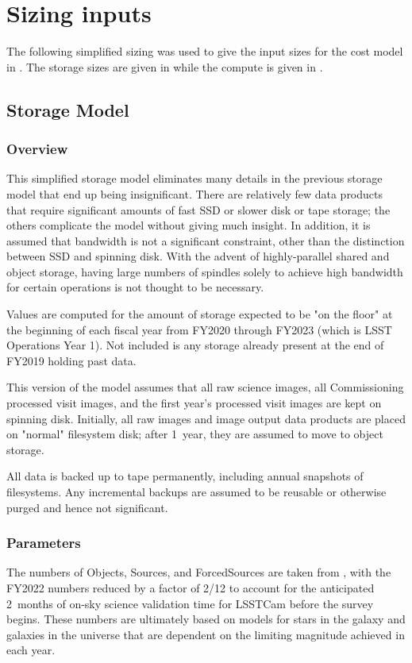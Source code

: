 \section{Sizing inputs}

The following simplified sizing was used to give the input sizes for the cost model in .
The storage sizes are given in  while the compute is given in .

\subsection{Storage Model}






\subsubsection{Overview}
This simplified storage model eliminates many details in the previous storage model  that end up being insignificant.
There are relatively few data products that require significant amounts of fast SSD or slower disk or tape storage; the others complicate the model without giving much insight.
In addition, it is assumed that bandwidth is not a significant constraint, other than the distinction between SSD and spinning disk.  With the advent of highly-parallel shared and object storage, having large numbers of spindles solely to achieve high bandwidth for certain operations is not thought to be necessary.

Values are computed for the amount of storage expected to be "on the floor" at the beginning of each fiscal year from FY2020 through FY2023 (which is LSST Operations Year 1).
Not included is any storage already present at the end of FY2019 holding past data.

This version of the model assumes that all raw science images, all Commissioning processed visit images, and the first year's processed visit images are kept on spinning disk.
Initially, all raw images and image output data products are placed on "normal" filesystem disk; after 1~year, they are assumed to move to object storage.

All data is backed up to tape permanently, including annual snapshots of filesystems.
Any incremental backups are assumed to be reusable or otherwise purged and hence not significant.

\subsubsection{Parameters}
The numbers of Objects, Sources, and ForcedSources are taken from , with the FY2022 numbers reduced by a factor of 2/12 to account for the anticipated 2~months of on-sky science validation time for LSSTCam before the survey begins.
These numbers are ultimately based on models for stars in the galaxy and galaxies in the universe that are dependent on the limiting magnitude achieved in each year.


